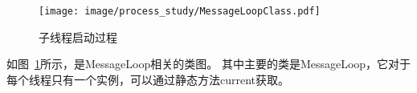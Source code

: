 \begin{figure}[H] 
  \centering 
  \texttt{[image: image/process\_study/MessageLoopClass.pdf]} 
  \caption{子线程启动过程} \label{fig:MessageLoopClass} 
\end{figure}

如图~\ref{fig:MessageLoopClass}所示，是MessageLoop相关的类图。
其中主要的类是MessageLoop，它对于每个线程只有一个实例，可以通过静态方法current获取。


%
%
%
